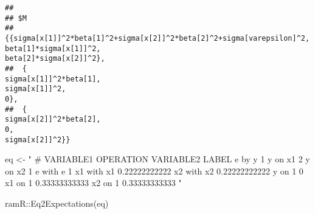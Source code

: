 \documentclass[
]{book}
\newenvironment{Shaded}{\begin{snugshade}}{\end{snugshade}}
\newcommand{\FunctionTok}[1]{\textcolor[rgb]{0.00,0.00,0.00}{#1}}
\newcommand{\NormalTok}[1]{#1}
\newcommand{\OtherTok}[1]{\textcolor[rgb]{0.56,0.35,0.01}{#1}}
\newcommand{\SpecialCharTok}[1]{\textcolor[rgb]{0.00,0.00,0.00}{#1}}
\newcommand{\StringTok}[1]{\textcolor[rgb]{0.31,0.60,0.02}{#1}}
\theoremstyle{definition}
\theoremstyle{definition}
\theoremstyle{definition}
\theoremstyle{remark}
\begin{document}
\begin{verbatim}
## 
## $M
## {{sigma[x[1]]^2*beta[1]^2+sigma[x[2]]^2*beta[2]^2+sigma[varepsilon]^2,                                               beta[1]*sigma[x[1]]^2,                                               beta[2]*sigma[x[2]]^2},
##  {                                              sigma[x[1]]^2*beta[1],                                                       sigma[x[1]]^2,                                                                   0},
##  {                                              sigma[x[2]]^2*beta[2],                                                                   0,                                                       sigma[x[2]]^2}}
\end{verbatim}

\begin{Shaded}
\begin{Highlighting}[]
\NormalTok{eq }\OtherTok{\textless{}{-}} \StringTok{"}
\StringTok{  \# VARIABLE1 OPERATION VARIABLE2 LABEL}
\StringTok{  e           by        y         1}
\StringTok{  y           on        x1        2}
\StringTok{  y           on        x2        1}
\StringTok{  e           with      e         1}
\StringTok{  x1          with      x1        0.22222222222}
\StringTok{  x2          with      x2        0.22222222222}
\StringTok{  y           on        1         0}
\StringTok{  x1          on        1         0.33333333333}
\StringTok{  x2          on        1         0.33333333333}
\StringTok{"}
\end{Highlighting}
\end{Shaded}

\begin{Shaded}
\begin{Highlighting}[]
\NormalTok{ramR}\SpecialCharTok{::}\FunctionTok{Eq2Expectations}\NormalTok{(eq)}
\end{Highlighting}
\end{Shaded}
\end{document}
